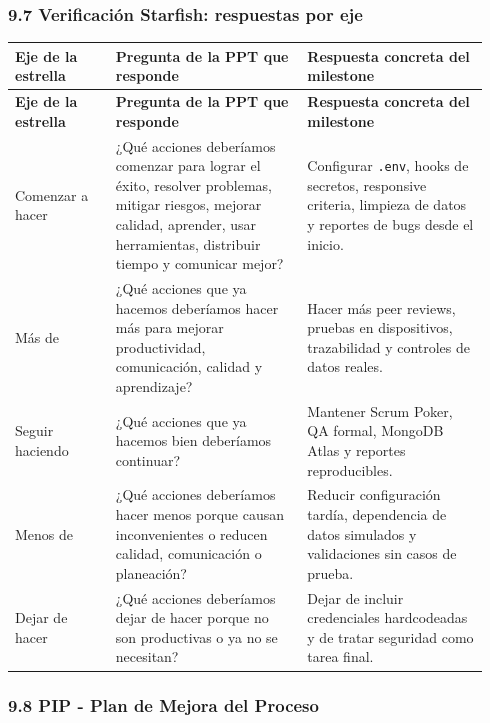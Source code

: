 \documentclass[11pt,a4paper]{article}
\begin{document}
\subsubsection{9.7 Verificación Starfish: respuestas por eje}

\begingroup
\scriptsize
\setlength{\tabcolsep}{3pt}
\begin{longtable}{P{0.20\linewidth}P{0.38\linewidth}P{0.36\linewidth}}
\toprule
\textbf{Eje de la estrella} & \textbf{Pregunta de la PPT que responde} & \textbf{Respuesta concreta del milestone} \\
\midrule
\endfirsthead
\toprule
\textbf{Eje de la estrella} & \textbf{Pregunta de la PPT que responde} & \textbf{Respuesta concreta del milestone} \\
\midrule
\endhead
\bottomrule
\endlastfoot
Comenzar a hacer & ¿Qué acciones deberíamos comenzar para lograr el éxito, resolver problemas, mitigar riesgos, mejorar calidad, aprender, usar herramientas, distribuir tiempo y comunicar mejor? & Configurar \texttt{.env}, hooks de secretos, responsive criteria, limpieza de datos y reportes de bugs desde el inicio. \\
Más de & ¿Qué acciones que ya hacemos deberíamos hacer más para mejorar productividad, comunicación, calidad y aprendizaje? & Hacer más peer reviews, pruebas en dispositivos, trazabilidad y controles de datos reales. \\
Seguir haciendo & ¿Qué acciones que ya hacemos bien deberíamos continuar? & Mantener Scrum Poker, QA formal, MongoDB Atlas y reportes reproducibles. \\
Menos de & ¿Qué acciones deberíamos hacer menos porque causan inconvenientes o reducen calidad, comunicación o planeación? & Reducir configuración tardía, dependencia de datos simulados y validaciones sin casos de prueba. \\
Dejar de hacer & ¿Qué acciones deberíamos dejar de hacer porque no son productivas o ya no se necesitan? & Dejar de incluir credenciales hardcodeadas y de tratar seguridad como tarea final. \\
\end{longtable}
\endgroup

\subsubsection{9.8 PIP - Plan de Mejora del Proceso}
\end{document}
